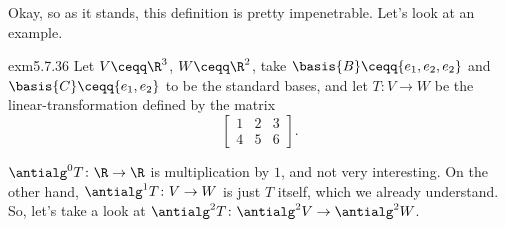 Okay, so as it stands, this definition is pretty impenetrable.  Let's look at an example.
\begin{exm}{}{exm5.7.36}
	Let $V\ceqq \R ^3$, $W\ceqq \R ^2$, take $\basis{B}\ceqq \{ e_1,e_2,e_2\}$ and $\basis{C}\ceqq \{ e_1,e_2\}$ to be the standard bases, and let $T\colon V\rightarrow W$ be the linear-transformation defined by the matrix
	\begin{equation}
		\begin{bmatrix}1 & 2 & 3 \\ 4 & 5 & 6\end{bmatrix}.
	\end{equation}
	
	$\antialg ^0T\colon \R \rightarrow \R$ is multiplication by $1$, and not very interesting.  On the other hand, $\antialg ^1T\colon V\rightarrow W$ is just $T$ itself, which we already understand.  So, let's take a look at $\antialg ^2T\colon \antialg ^2V\rightarrow \antialg ^2W$.
	

\end{exm}
